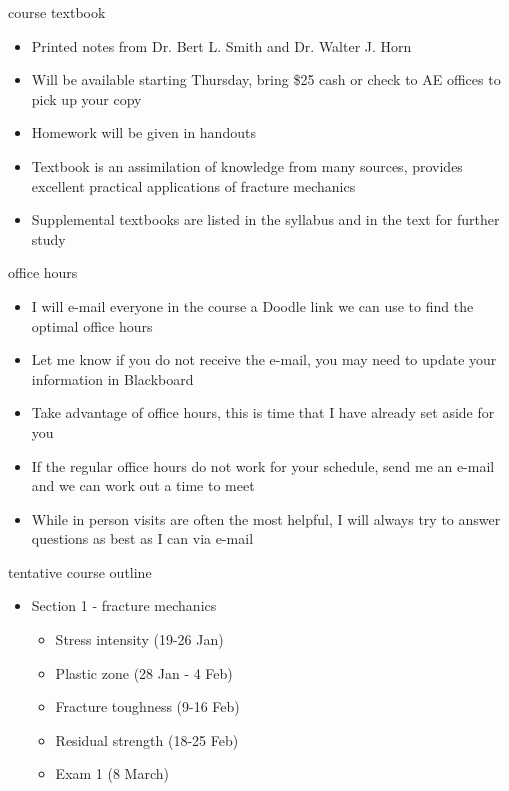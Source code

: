 \documentclass[10pt]{beamer}
\begin{document}
\begin{frame}{course textbook}
  \begin{itemize}
  \item Printed notes from Dr. Bert L. Smith and Dr. Walter J. Horn
  \item Will be available starting Thursday, bring \$25 cash or check to AE offices to pick up your copy
  \item Homework will be given in handouts
  \item Textbook is an assimilation of knowledge from many sources, provides excellent practical applications of fracture mechanics
  \item Supplemental textbooks are listed in the syllabus and in the text for further study
  \end{itemize}
\end{frame}

\begin{frame}{office hours}
  \begin{itemize}
  \item I will e-mail everyone in the course a Doodle link we can use to find the optimal office hours
  \item Let me know if you do not receive the e-mail, you may need to update your information in Blackboard
  \item Take advantage of office hours, this is time that I have already set aside for you
  \item If the regular office hours do not work for your schedule, send me an e-mail and we can work out a time to meet
  \item While in person visits are often the most helpful, I will always try to answer questions as best as I can via e-mail
  \end{itemize}
\end{frame}

\begin{frame}{tentative course outline}
\begin{itemize}
\item Section 1 - fracture mechanics
\begin{itemize}
	\item Stress intensity (19-26 Jan)
	\item Plastic zone (28 Jan - 4 Feb)
	\item Fracture toughness (9-16 Feb)
	\item Residual strength (18-25 Feb)
	\item Exam 1 (8 March)
\end{itemize}
\end{itemize}
\end{frame}
\end{document}

